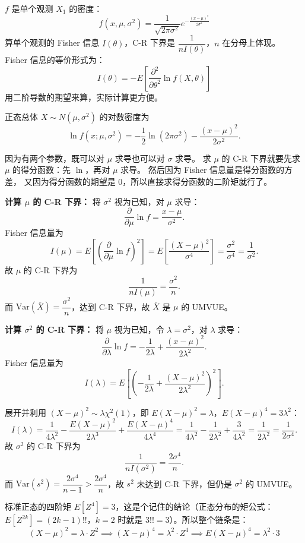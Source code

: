 \begin{dxtips}
    $f$ 是单个观测 $X_1$ 的密度：
$$f(x, \mu, \sigma^2) = \frac{1}{\sqrt{2\pi\sigma^2}} e^{-\frac{(x-\mu)^2}{2\sigma^2}}$$
算单个观测的 Fisher 信息 $I(\theta)$，C-R 下界是 $\dfrac{1}{nI(\theta)}$，$n$ 在分母上体现。
Fisher 信息的等价形式为：
$$I(\theta) = -E\left[\frac{\partial^2}{\partial \theta^2} \ln f(X, \theta)\right]$$
用二阶导数的期望来算，实际计算更方便。
\end{dxtips}

\begin{solution}

正态总体 $X \sim N(\mu, \sigma^2)$ 的对数密度为
$$
\ln f(x;\mu,\sigma^2) = -\frac{1}{2}\ln(2\pi\sigma^2) - \frac{(x-\mu)^2}{2\sigma^2}.
$$
\begin{dxtips}
因为有两个参数，既可以对 $\mu$ 求导也可以对 $\sigma$ 求导。
求 $\mu$ 的 C-R 下界就要先求 $\mu$ 的得分函数：先 $\ln$，再对 $\mu$ 求导。
然后因为 Fisher 信息量是得分函数的方差，
又因为得分函数的期望是 $0$，所以直接求得分函数的二阶矩就行了。
\end{dxtips}
\textbf{计算 $\mu$ 的 C-R 下界：} 将 $\sigma^2$ 视为已知，对 $\mu$ 求导：
$$
\frac{\partial}{\partial \mu}\ln f = \frac{x - \mu}{\sigma^2}.
$$
Fisher 信息量为
$$
I(\mu) = E\left[\left(\frac{\partial}{\partial \mu}\ln f\right)^2\right] = E\left[\frac{(X-\mu)^2}{\sigma^4}\right] = \frac{\sigma^2}{\sigma^4} = \frac{1}{\sigma^2}.
$$
故 $\mu$ 的 C-R 下界为
$$
\frac{1}{nI(\mu)} = \frac{\sigma^2}{n}.
$$
而 $\mathrm{Var}(\overline{X}) = \dfrac{\sigma^2}{n}$，达到 C-R 下界，故 $\overline{X}$ 是 $\mu$ 的 UMVUE。

\textbf{计算 $\sigma^2$ 的 C-R 下界：} 将 $\mu$ 视为已知，令 $\lambda = \sigma^2$，对 $\lambda$ 求导：
$$
\frac{\partial}{\partial \lambda}\ln f = -\frac{1}{2\lambda} + \frac{(x-\mu)^2}{2\lambda^2}.
$$
Fisher 信息量为
$$
I(\lambda) = E\left[\left(-\frac{1}{2\lambda} + \frac{(X-\mu)^2}{2\lambda^2}\right)^2\right].
$$

展开并利用 $(X-\mu)^2 \sim \lambda\chi^2(1)$，即 $E(X-\mu)^2 = \lambda$，$E(X-\mu)^4 = 3\lambda^2$：
$$
I(\lambda) = \frac{1}{4\lambda^2} - \frac{E(X-\mu)^2}{2\lambda^3} + \frac{E(X-\mu)^4}{4\lambda^4} = \frac{1}{4\lambda^2} - \frac{1}{2\lambda^2} + \frac{3}{4\lambda^2} = \frac{1}{2\lambda^2} = \frac{1}{2\sigma^4}.
$$
故 $\sigma^2$ 的 C-R 下界为
$$
\frac{1}{nI(\sigma^2)} = \frac{2\sigma^4}{n}.
$$
而 $\mathrm{Var}(s^2) = \dfrac{2\sigma^4}{n-1} > \dfrac{2\sigma^4}{n}$，故 $s^2$ 未达到 C-R 下界，但仍是 $\sigma^2$ 的 UMVUE。
\end{solution}
\begin{note}
    标准正态的四阶矩 $E[Z^4] = 3$，这是个记住的结论（正态分布的矩公式：$E[Z^{2k}] = (2k-1)!!$，$k=2$ 时就是 $3!! = 3$）。所以整个链条是：
$$(X-\mu)^2 = \lambda \cdot Z^2 \implies (X-\mu)^4 = \lambda^2 \cdot Z^4 \implies E(X-\mu)^4 = \lambda^2 \cdot 3$$
\end{note}
